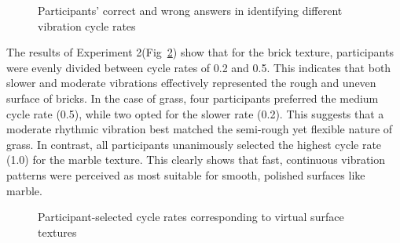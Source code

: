 \documentclass[a4paper,twocolumn]{article}
\begin{document}
% 	

\begin{figure}[H]\centering
	
	\caption{Participants' correct and wrong answers in identifying different vibration cycle rates}\label{fig:C_W_ex1}
\end{figure}

The results of Experiment 2(Fig~\ref{fig:ex2_results}) show that for the brick texture, participants were evenly divided between cycle rates of 0.2 and 0.5. This indicates that both slower and moderate vibrations effectively represented the rough and uneven surface of bricks.
In the case of grass, four participants preferred the medium cycle rate (0.5), while two opted for the slower rate (0.2). This suggests that a moderate rhythmic vibration best matched the semi-rough yet flexible nature of grass.
In contrast, all participants unanimously selected the highest cycle rate (1.0) for the marble texture. This clearly shows that fast, continuous vibration patterns were perceived as most suitable for smooth, polished surfaces like marble.


\begin{figure}[H]\centering
	
	\caption{Participant-selected cycle rates corresponding to virtual surface textures}\label{fig:ex2_results}
\end{figure}
\end{document}
